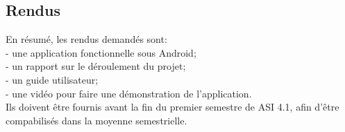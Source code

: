 \subsection{Rendus}
En résumé, les rendus demandés sont:\\
    \indent- une application fonctionnelle sous Android;\\
    \indent- un rapport sur le déroulement du projet;\\
    \indent- un guide utilisateur;\\
	\indent- une vidéo pour faire une démonstration de l'application.\\
\indent Ils doivent être fournis avant la fin du premier semestre de ASI 4.1, afin d'être compabilisés dans la moyenne semestrielle.
\newpage
